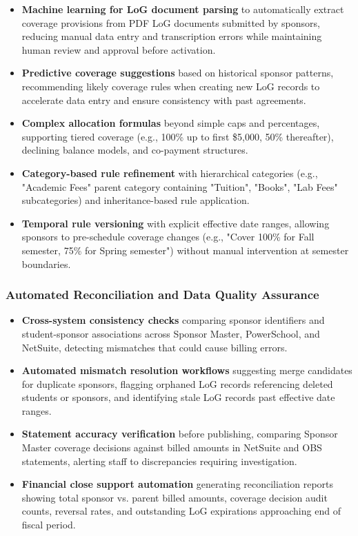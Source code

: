 \begin{itemize}
    \item \textbf{Machine learning for LoG document parsing} to automatically extract coverage provisions from PDF LoG documents submitted by sponsors, reducing manual data entry and transcription errors while maintaining human review and approval before activation.
    \item \textbf{Predictive coverage suggestions} based on historical sponsor patterns, recommending likely coverage rules when creating new LoG records to accelerate data entry and ensure consistency with past agreements.
    \item \textbf{Complex allocation formulas} beyond simple caps and percentages, supporting tiered coverage (e.g., 100\% up to first \$5,000, 50\% thereafter), declining balance models, and co-payment structures.
    \item \textbf{Category-based rule refinement} with hierarchical categories (e.g., "Academic Fees" parent category containing "Tuition", "Books", "Lab Fees" subcategories) and inheritance-based rule application.
    \item \textbf{Temporal rule versioning} with explicit effective date ranges, allowing sponsors to pre-schedule coverage changes (e.g., "Cover 100\% for Fall semester, 75\% for Spring semester") without manual intervention at semester boundaries.
\end{itemize}

\subsubsection{Automated Reconciliation and Data Quality Assurance}

\begin{itemize}
    \item \textbf{Cross-system consistency checks} comparing sponsor identifiers and student-sponsor associations across Sponsor Master, PowerSchool, and NetSuite, detecting mismatches that could cause billing errors.
    \item \textbf{Automated mismatch resolution workflows} suggesting merge candidates for duplicate sponsors, flagging orphaned LoG records referencing deleted students or sponsors, and identifying stale LoG records past effective date ranges.
    \item \textbf{Statement accuracy verification} before publishing, comparing Sponsor Master coverage decisions against billed amounts in NetSuite and OBS statements, alerting staff to discrepancies requiring investigation.
    \item \textbf{Financial close support automation} generating reconciliation reports showing total sponsor vs. parent billed amounts, coverage decision audit counts, reversal rates, and outstanding LoG expirations approaching end of fiscal period.
\end{itemize}


